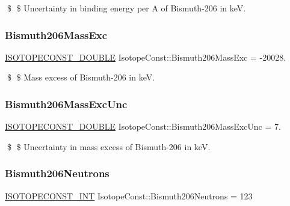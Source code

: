 \$ \$ Uncertainty in binding energy per A of Bismuth-\/206 in keV. \mbox{\label{group___isotope_const-_bismuth-_bi206_gaa13318a3f92a10a85bcd072303501547}} 
\subsubsection{\texorpdfstring{Bismuth206\+Mass\+Exc}{Bismuth206MassExc}}
{\footnotesize\ttfamily \mbox{\hyperlink{group___isotope_const-_macros_ga8f45a7272ce02c0b4c65c44636ed719a}{I\+S\+O\+T\+O\+P\+E\+C\+O\+N\+S\+T\+\_\+\+D\+O\+U\+B\+LE}} Isotope\+Const\+::\+Bismuth206\+Mass\+Exc = -\/20028.}

\$ \$ Mass excess of Bismuth-\/206 in keV. \mbox{\label{group___isotope_const-_bismuth-_bi206_ga78bd42636b191855aeb1184be1dd394d}} 
\subsubsection{\texorpdfstring{Bismuth206\+Mass\+Exc\+Unc}{Bismuth206MassExcUnc}}
{\footnotesize\ttfamily \mbox{\hyperlink{group___isotope_const-_macros_ga8f45a7272ce02c0b4c65c44636ed719a}{I\+S\+O\+T\+O\+P\+E\+C\+O\+N\+S\+T\+\_\+\+D\+O\+U\+B\+LE}} Isotope\+Const\+::\+Bismuth206\+Mass\+Exc\+Unc = 7.}

\$ \$ Uncertainty in mass excess of Bismuth-\/206 in keV. \mbox{\label{group___isotope_const-_bismuth-_bi206_ga9a07a3210ca34b8e79524b80b3cf9d11}} 
\subsubsection{\texorpdfstring{Bismuth206\+Neutrons}{Bismuth206Neutrons}}
{\footnotesize\ttfamily \mbox{\hyperlink{group___isotope_const-_macros_ga5f18360b3e99483a35c32d789e62621c}{I\+S\+O\+T\+O\+P\+E\+C\+O\+N\+S\+T\+\_\+\+I\+NT}} Isotope\+Const\+::\+Bismuth206\+Neutrons = 123}

